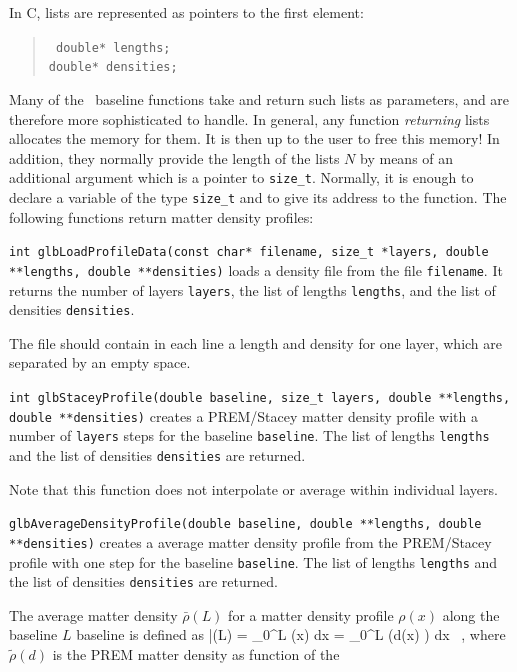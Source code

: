 In C, lists are represented as pointers to the first element:
\begin{quote}
{\tt  
  double* lengths; \\
  double* densities;
}
\end{quote}
Many of the \GLOBES\ baseline functions take and return
such lists as parameters, and are therefore more sophisticated
to handle. In general, any function
{\em returning} lists allocates the memory for them.
It is then up to the user to free this memory!
In addition, they normally provide the length of the lists $N$
by means of an additional argument which is a pointer to {\tt size\_t}. 
Normally, it is enough to declare
a variable of the type {\tt size\_t} and to give its address to the function.
The following functions return matter density profiles:
\begin{function}
{\tt int glbLoadProfileData(const char* filename, size\_t *layers, double **lengths, double **densities)} loads a density file from the file
{\tt filename}. It returns the number of layers {\tt layers}, the
list of lengths {\tt lengths}, and the list of densities {\tt densities}.
\end{function}
The file should contain in each line a length and density for one layer,
which are separated by an empty space.
\begin{function}
{\tt int glbStaceyProfile(double baseline, size\_t layers, double **lengths, double **densities)} creates a PREM/Stacey matter density profile with a
number of {\tt layers} steps for the baseline {\tt baseline}. The list of lengths {\tt lengths} and the list of densities {\tt densities} are returned.
\end{function}
Note that this function does not interpolate or average within individual layers.
\begin{function}
{\tt glbAverageDensityProfile(double baseline, double **lengths, 
double **densities)} creates a average matter density profile from the PREM/Stacey profile with one step for the baseline {\tt baseline}. The list of lengths {\tt lengths} and the list of densities {\tt densities} are returned.
\end{function}
The average matter density $\bar{\rho}(L)$ for a matter density profile $\rho(x)$ along the baseline $L$ baseline is defined as
\be
\bar{\rho}(L) =  \int\limits_{0}^L \rho(x) dx = 
 \int\limits_{0}^L \tilde{\rho}\left(d(x) \right) dx \, , 
\ee
where $\tilde{\rho}(d)$ is the PREM matter density as function of the
